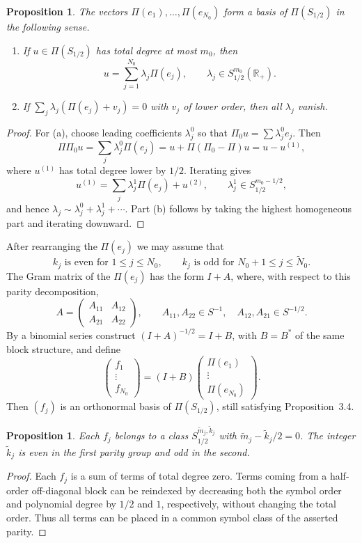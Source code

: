 \documentclass[11pt,a4paper]{article}
\newcommand{\R}{\mathbb R}
\numberwithin{equation}{section}
\newtheorem{proposition}[theorem]{Proposition}
\theoremstyle{remark}
\begin{document}
\begin{proposition}
The vectors $\Pi(e_1),\ldots,\Pi(e_{N_0})$ form a basis of $\Pi(S_{1/2})$ in the following sense.
\begin{enumerate}[label=(\alph*)]
\item If $u\in\Pi(S_{1/2})$ has total degree at most $m_0$, then
\[
u=\sum_{j=1}^{N_0}\lambda_j\Pi(e_j),
\qquad \lambda_j\in S_{1/2}^{m_0}(\R_+).
\]
\item If $\sum_j\lambda_j(\Pi(e_j)+v_j)=0$ with $v_j$ of lower order, then all $\lambda_j$ vanish.
\end{enumerate}
\end{proposition}
\begin{proof}
For (a), choose leading coefficients $\lambda_j^0$ so that $\Pi_0u=\sum\lambda_j^0e_j$. Then
\[
\Pi\Pi_0u=\sum_j\lambda_j^0\Pi(e_j)
=u+\Pi(\Pi_0-\Pi)u=u-u^{(1)},
\]
where $u^{(1)}$ has total degree lower by $1/2$. Iterating gives
\[
u^{(1)}=\sum_j\lambda_j^1\Pi(e_j)+u^{(2)},\qquad
\lambda_j^1\in S_{1/2}^{m_0-1/2},
\]
and hence $\lambda_j\sim\lambda_j^0+\lambda_j^1+\cdots$. Part (b) follows by taking the highest homogeneous part and iterating downward.
\end{proof}

After rearranging the $\Pi(e_j)$ we may assume that
\begin{equation}
k_j\text{ is even for }1\le j\le N_0,
\qquad k_j\text{ is odd for }N_0+1\le j\le\widetilde N_0.
\end{equation}
The Gram matrix of the $\Pi(e_j)$ has the form $I+A$, where, with respect to this parity decomposition,
\[
A=\begin{pmatrix}A_{11}&A_{12}\\A_{21}&A_{22}\end{pmatrix},
\qquad
A_{11},A_{22}\in S^{-1},\quad A_{12},A_{21}\in S^{-1/2}.
\]
By a binomial series construct $(I+A)^{-1/2}=I+B$, with $B=B^*$ of the same block structure, and define
\[
\begin{pmatrix}f_1\\ \vdots\\ f_{N_0}\end{pmatrix}
=(I+B)\begin{pmatrix}\Pi(e_1)\\ \vdots\\ \Pi(e_{N_0})\end{pmatrix}.
\]
Then $(f_j)$ is an orthonormal basis of $\Pi(S_{1/2})$, still satisfying Proposition~3.4.

\begin{proposition}
Each $f_j$ belongs to a class $S_{1/2}^{\widetilde m_j,\widetilde k_j}$ with $\widetilde m_j-\widetilde k_j/2=0$. The integer $\widetilde k_j$ is even in the first parity group and odd in the second.
\end{proposition}
\begin{proof}
Each $f_j$ is a sum of terms of total degree zero. Terms coming from a half-order off-diagonal block can be reindexed by decreasing both the symbol order and polynomial degree by $1/2$ and $1$, respectively, without changing the total order. Thus all terms can be placed in a common symbol class of the asserted parity.
\end{proof}
\end{document}
